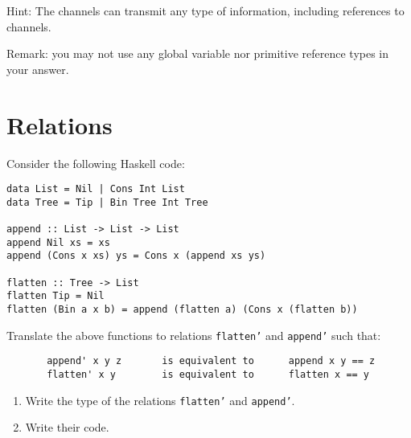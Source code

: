 \documentclass{article}
\newcommand{\answer}[1]{}
\begin{document}
Hint: The channels can transmit any type of information, including
references to channels.

Remark: you may not use any global variable nor primitive reference
types in your answer.

\answer{
  \begin{verbatim}    
data Command a = Get (Chan a) | Set a
type Variable a = Chan (Command a)

handler :: Variable a -> a -> IO ()
handler v a = do
  command <- readChan v
  case command of
    Set a' -> handler v a'
    Get c -> do 
      writeChan c a
      handler v a

newVariable :: a -> IO (Variable a)
newVariable a = do
  c <- newChan
  forkIO (handler c a)
  return c

get :: Variable a -> IO a
get v = do
  c <- newChan
  writeChan v (Get c)
  readChan c
  
set :: Variable a -> a -> IO ()
set v a = do
  writeChan v (Set a)
  \end{verbatim}
}

\newpage
\section{Relations}

Consider the following Haskell code:

\begin{verbatim}
data List = Nil | Cons Int List
data Tree = Tip | Bin Tree Int Tree

append :: List -> List -> List
append Nil xs = xs
append (Cons x xs) ys = Cons x (append xs ys)

flatten :: Tree -> List
flatten Tip = Nil
flatten (Bin a x b) = append (flatten a) (Cons x (flatten b))
\end{verbatim}

Translate the above functions to relations \texttt{flatten'} and
\texttt{append'} such that:
\begin{verbatim}
       append' x y z       is equivalent to      append x y == z
       flatten' x y        is equivalent to      flatten x == y
\end{verbatim}

\begin{enumerate}
\item Write the type of the relations \texttt{flatten'} and
  \texttt{append'}. 
\item Write their code. 
\end{enumerate}
\end{document}
